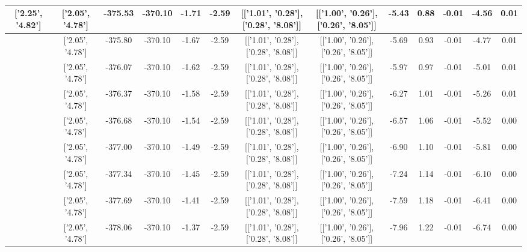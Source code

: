 \begin{table}[htbp]
\begin{adjustbox}{angle=90}
\begin{tabular}{|c|c|c|c|c|c|c|c|c|c|c|c|c|}
 ['2.25', '4.82'] & ['2.05', '4.78'] & -375.53 & -370.10 & -1.71 & -2.59 & [['1.01', '0.28'], ['0.28', '8.08']] & [['1.00', '0.26'], ['0.26', '8.05']] & -5.43 & 0.88 & -0.01 & -4.56 & 0.01\\ \hline
 ['2.26', '4.83'] & ['2.05', '4.78'] & -375.80 & -370.10 & -1.67 & -2.59 & [['1.01', '0.28'], ['0.28', '8.08']] & [['1.00', '0.26'], ['0.26', '8.05']] & -5.69 & 0.93 & -0.01 & -4.77 & 0.01\\ \hline
 ['2.27', '4.83'] & ['2.05', '4.78'] & -376.07 & -370.10 & -1.62 & -2.59 & [['1.01', '0.28'], ['0.28', '8.08']] & [['1.00', '0.26'], ['0.26', '8.05']] & -5.97 & 0.97 & -0.01 & -5.01 & 0.01\\ \hline
 ['2.28', '4.83'] & ['2.05', '4.78'] & -376.37 & -370.10 & -1.58 & -2.59 & [['1.01', '0.28'], ['0.28', '8.08']] & [['1.00', '0.26'], ['0.26', '8.05']] & -6.27 & 1.01 & -0.01 & -5.26 & 0.01\\ \hline
 ['2.30', '4.83'] & ['2.05', '4.78'] & -376.68 & -370.10 & -1.54 & -2.59 & [['1.01', '0.28'], ['0.28', '8.08']] & [['1.00', '0.26'], ['0.26', '8.05']] & -6.57 & 1.06 & -0.01 & -5.52 & 0.00\\ \hline
 ['2.31', '4.84'] & ['2.05', '4.78'] & -377.00 & -370.10 & -1.49 & -2.59 & [['1.01', '0.28'], ['0.28', '8.08']] & [['1.00', '0.26'], ['0.26', '8.05']] & -6.90 & 1.10 & -0.01 & -5.81 & 0.00\\ \hline
 ['2.32', '4.84'] & ['2.05', '4.78'] & -377.34 & -370.10 & -1.45 & -2.59 & [['1.01', '0.28'], ['0.28', '8.08']] & [['1.00', '0.26'], ['0.26', '8.05']] & -7.24 & 1.14 & -0.01 & -6.10 & 0.00\\ \hline
 ['2.33', '4.84'] & ['2.05', '4.78'] & -377.69 & -370.10 & -1.41 & -2.59 & [['1.01', '0.28'], ['0.28', '8.08']] & [['1.00', '0.26'], ['0.26', '8.05']] & -7.59 & 1.18 & -0.01 & -6.41 & 0.00\\ \hline
 ['2.34', '4.84'] & ['2.05', '4.78'] & -378.06 & -370.10 & -1.37 & -2.59 & [['1.01', '0.28'], ['0.28', '8.08']] & [['1.00', '0.26'], ['0.26', '8.05']] & -7.96 & 1.22 & -0.01 & -6.74 & 0.00\\ \hline
            \end{tabular}
        \end{adjustbox}
        \caption{}
        \label{}
    \end{table}
    